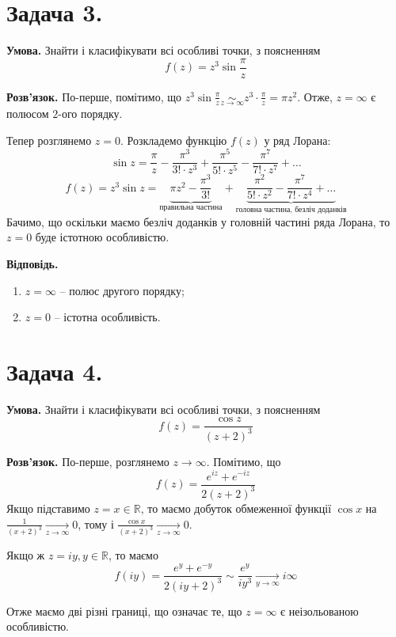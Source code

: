 \documentclass[14pt]{extarticle}
\begin{document}
\pagebreak

\section*{Задача 3.} 

\textbf{Умова.} Знайти і класифікувати всі особливі точки, з поясненням
\[
f(z) = z^3\sin \frac{\pi}{z}
\]

\textbf{Розв'язок.} По-перше, помітимо, що $z^3\sin\frac{\pi}{z}\underset{z \to \infty}{\sim} z^3 \cdot \frac{\pi}{z}=\pi z^2$. Отже, $z=\infty$ є полюсом $2$-ого порядку. 

Тепер розглянемо $z=0$. Розкладемо функцію $f(z)$ у ряд Лорана:
\[
\sin z = \frac{\pi}{z} - \frac{\pi^3}{3!\cdot z^3} + \frac{\pi^5}{5!\cdot z^5} - \frac{\pi^7}{7!\cdot z^7} + \dots
\]
\[
f(z) = z^3\sin z = \underbrace{\pi z^2 - \frac{\pi^3}{3!}}_{\text{правильна частина}} + \underbrace{\frac{\pi^2}{5! \cdot z^2} - \frac{\pi^7}{7! \cdot z^4} + \dots}_{\text{головна частина, безліч доданків}}
\]
Бачимо, що оскільки маємо безліч доданків у головній частині ряда Лорана, то $z=0$ буде істотною особливістю. 

\textbf{Відповідь.}
\begin{enumerate}
    \item $z=\infty$ -- полюс другого порядку;
    \item $z=0$ -- істотна особливість.
\end{enumerate}

\pagebreak

\section*{Задача 4.} 

\textbf{Умова.} Знайти і класифікувати всі особливі точки, з поясненням
\[
f(z) = \frac{\cos z}{(z+2)^3}
\]

\textbf{Розв'язок.} По-перше, розглянемо $z \to \infty$. Помітимо, що
\[
f(z) = \frac{e^{iz} + e^{-iz}}{2(z+2)^3}
\]
Якщо підставимо $z = x \in \mathbb{R}$, то маємо добуток обмеженної функції $\cos x$ на $\frac{1}{(x+2)^3} \xrightarrow[z \to \infty]{} 0$, тому і $\frac{\cos x}{(x+2)^3} \xrightarrow[z \to \infty]{} 0$.

Якщо ж $z = iy, y \in \mathbb{R}$, то маємо
\[
f(iy) = \frac{e^{y}+e^{-y}}{2(iy+2)^3} \sim \frac{e^y}{iy^3} \xrightarrow[y \to \infty]{} i\infty
\]

Отже маємо дві різні границі, що означає те, що $z=\infty$ є неізольованою особливістю.
\end{document}
